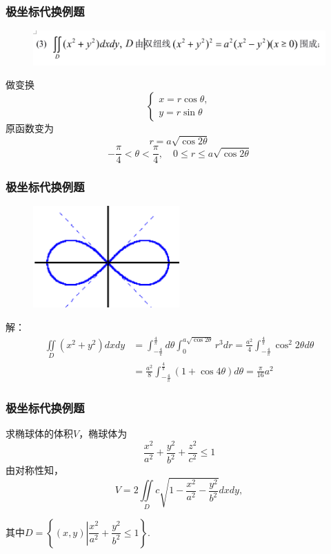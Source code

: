 \documentclass[xetex]{beamer}
\begin{document}
\begin{frame}
    \frametitle{极坐标代换例题}
    \begin{figure}[ht]
        \centering %
       \includegraphics[width=1.0\textwidth]{img/a.jpg}
    \end{figure}
    \pause
    做变换
    $$\begin{cases}
        x=r\cos{\theta},\\
        y=r\sin{\theta}
    \end{cases}$$
    原函数变为
    $$r = a \sqrt{\cos{2 \theta}} $$
    $$- \frac{\pi}{4} < \theta < \frac{\pi}{4}, \quad 0 \leq r \leq a \sqrt{\cos{2 \theta}} $$
\end{frame}
    
\begin{frame}
    \frametitle{极坐标代换例题}
    \begin{figure}[ht]
        \centering %
       \includegraphics[width=0.5\textwidth]{img/c.jpg}
    \end{figure}
    \pause
    解：
    \begin{align*} 
        \iint \limits_D (x^2 + y^2) dxdy &= \int _{ - \frac{4}{\pi} } ^{ \frac{4}{\pi} } d \theta \int _0 ^{a \sqrt{ \cos{2 \theta} } } r^3 dr = \frac{a^2} {4} \int  _{ - \frac{4}{\pi} } ^{ \frac{4}{\pi} } \cos ^2 {2 \theta} d \theta \\
        &= \frac {a^2} {8} \int _{ - \frac{4}{\pi} } ^{ \frac{4}{\pi} } (1+ \cos{4 \theta}) d \theta = \frac{\pi} {16} a^2
    \end{align*}
\end{frame}

\begin{frame}
    \frametitle{极坐标代换例题}
    求椭球体的体积$V$，椭球体为
    $$\dfrac{x^2}{a^2}+\dfrac{y^2}{b^2}+\dfrac{z^2}{c^2}\leq1$$
    \pause
    由对称性知，
    $$V=2\iint\limits_Dc\sqrt{1-\frac{x^2}{a^2}-\frac{y^2}{b^2}}dxdy,$$
    \begin{center}
    其中$D=\left\{(x,y) \left| \dfrac{x^2}{a^2}+\dfrac{y^2}{b^2}\leq1\right\}.$
    \end{center}
\end{frame}    
\end{document}
